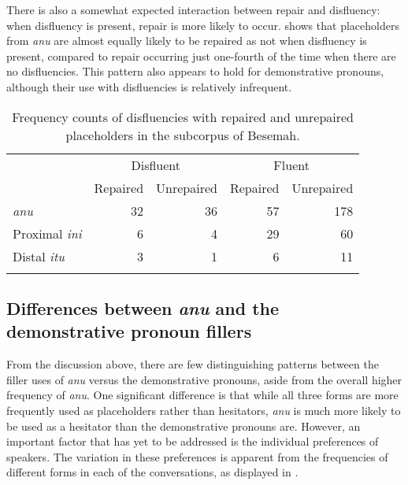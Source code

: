 \documentclass[output=paper,
\ChapterDOI{10.5281/zenodo.15697583}
colorlinks,
citecolor=brown]{langscibook}
\begin{document}
There is also a somewhat expected interaction between repair and disfluency: when disfluency is present, repair is more likely to occur.  shows that placeholders from \textit{anu} are almost equally likely to be repaired as not when disfluency is present, compared to repair occurring just one-fourth of the time when there are no disfluencies. This pattern also appears to hold for demonstrative pronouns, although their use with disfluencies is relatively infrequent.

\begin{table}
\caption{Frequency counts of disfluencies with repaired and unrepaired placeholders in the subcorpus of Besemah.}
\label{tab:disfluency-repair}
\begin{tabularx}{.8\textwidth}{X@{} rr rr}
\lsptoprule
  & \multicolumn{2}{c}{ {Disfluent}} & \multicolumn{2}{c}{ {Fluent}} \\
  \cmidrule(lr){2-3}\cmidrule(lr){4-5}
  & Repaired & Unrepaired & Repaired & Unrepaired \\
  \midrule
  \textit{anu} & 32 & 36 & 57 & 178 \\ %
  Proximal \textit{ini} & 6 & 4 & 29 & 60\\
  Distal \textit{itu} & 3 & 1 & 6 & 11 \\
\lspbottomrule
\end{tabularx}
\end{table}


\subsection{Differences between \textit{anu} and the demonstrative pronoun fillers}
From the discussion above, there are few distinguishing patterns between the filler uses of \textit{anu} versus the demonstrative pronouns, aside from the overall higher frequency of \textit{anu}. One significant difference is that while all three forms are more frequently used as placeholders rather than hesitators, \textit{anu} is much more likely to be used as a hesitator than the demonstrative pronouns are. However, an important factor that has yet to be addressed is the individual preferences of speakers. The variation in these preferences is apparent from the frequencies of different forms in each of the conversations, as displayed in .
\end{document}
